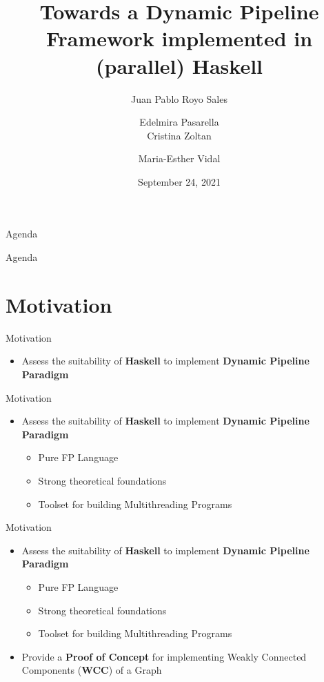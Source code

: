 \documentclass{beamer}
\title[IEBT in Haskell]{Towards a Dynamic Pipeline Framework implemented in (parallel) Haskell}
\author[Royo Sales et al. (PROLE2021)] 
{%
  Juan Pablo Royo Sales\inst{1} \and Edelmira Pasarella\inst{1}\\
  Cristina Zoltan\inst{1} \and Maria-Esther Vidal\inst{2}
}
\institute[] %
{
  \inst{1}%
  Universitat Politecnica de Catalunya\\
  juan.pablo.royo@upc.edu\\
  \{zoltan,edelmira\}@cs.upc.edu \and
  \inst{2}%
  TIB/L3S Research Centre at the University of Hannover\\
  maria.vidal@tib.eu
  }
\date[September 24, 2021] %
  {September 24, 2021}
\begin{document}
  \begin{frame}
    \vspace{1.2cm}
    \titlepage
  \end{frame}

  \begin{frame}{Agenda}
    \tableofcontents
  \end{frame}
  
  \begin{frame}{Agenda}
    \section{Motivation}
    \tableofcontents[currentsection]
  \end{frame}

  \begin{frame}[fragile]{Motivation}
    \begin{itemize}
      \item Assess the suitability of \textbf{Haskell} to implement \textbf{Dynamic Pipeline Paradigm}
    \end{itemize}    
  \end{frame}

  \begin{frame}[fragile]{Motivation}
    \begin{itemize}
      \item Assess the suitability of \textbf{Haskell} to implement \textbf{Dynamic Pipeline Paradigm}
      \vspace{0.5cm}
      \begin{itemize}
        \item Pure FP Language
        \item Strong theoretical foundations
        \item Toolset for building Multithreading Programs
      \end{itemize}
    \end{itemize}    
  \end{frame}

  \begin{frame}[fragile]{Motivation}
    \begin{itemize}
      \item Assess the suitability of \textbf{Haskell} to implement \textbf{Dynamic Pipeline Paradigm}
      \vspace{0.5cm}
      \begin{itemize}
        \item Pure FP Language
        \item Strong theoretical foundations
        \item Toolset for building Multithreading Programs
      \end{itemize}
      \vspace{0.5cm}
      \item Provide a \textbf{Proof of Concept} for implementing Weakly Connected Components (\textbf{WCC}) of a Graph
    \end{itemize}    
  \end{frame}
\end{document}
